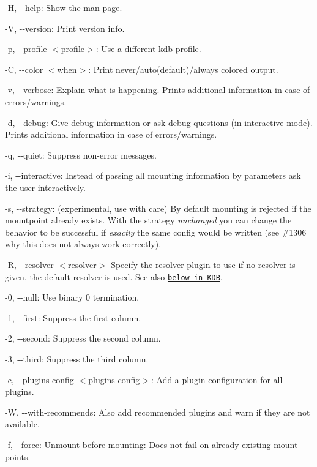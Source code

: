 \begin{DoxyItemize}
\item {\ttfamily -\/H}, {\ttfamily -\/-\/help}\+: Show the man page.
\item {\ttfamily -\/V}, {\ttfamily -\/-\/version}\+: Print version info.
\item {\ttfamily -\/p}, {\ttfamily -\/-\/profile $<$profile$>$}\+: Use a different kdb profile.
\item {\ttfamily -\/C}, {\ttfamily -\/-\/color $<$when$>$}\+: Print never/auto(default)/always colored output.
\item {\ttfamily -\/v}, {\ttfamily -\/-\/verbose}\+: Explain what is happening. Prints additional information in case of errors/warnings.
\item {\ttfamily -\/d}, {\ttfamily -\/-\/debug}\+: Give debug information or ask debug questions (in interactive mode). Prints additional information in case of errors/warnings.
\item {\ttfamily -\/q}, {\ttfamily -\/-\/quiet}\+: Suppress non-\/error messages.
\item {\ttfamily -\/i}, {\ttfamily -\/-\/interactive}\+: Instead of passing all mounting information by parameters ask the user interactively.
\item {\ttfamily -\/s}, {\ttfamily -\/-\/strategy}\+: (experimental, use with care) By default mounting is rejected if the mountpoint already exists. With the strategy {\itshape unchanged} you can change the behavior to be successful if {\itshape exactly} the same config would be written (see \#1306 why this does not always work correctly).
\item {\ttfamily -\/R}, {\ttfamily -\/-\/resolver $<$resolver$>$} Specify the resolver plugin to use if no resolver is given, the default resolver is used. See also \href{#KDB}{\tt below in K\+DB}.
\item {\ttfamily -\/0}, {\ttfamily -\/-\/null}\+: Use binary 0 termination.
\item {\ttfamily -\/1}, {\ttfamily -\/-\/first}\+: Suppress the first column.
\item {\ttfamily -\/2}, {\ttfamily -\/-\/second}\+: Suppress the second column.
\item {\ttfamily -\/3}, {\ttfamily -\/-\/third}\+: Suppress the third column.
\item {\ttfamily -\/c}, {\ttfamily -\/-\/plugins-\/config $<$plugins-\/config$>$}\+: Add a plugin configuration for all plugins.
\item {\ttfamily -\/W}, {\ttfamily -\/-\/with-\/recommends}\+: Also add recommended plugins and warn if they are not available.
\item {\ttfamily -\/f}, {\ttfamily -\/-\/force}\+: Unmount before mounting\+: Does not fail on already existing mount points.
\end{DoxyItemize}

